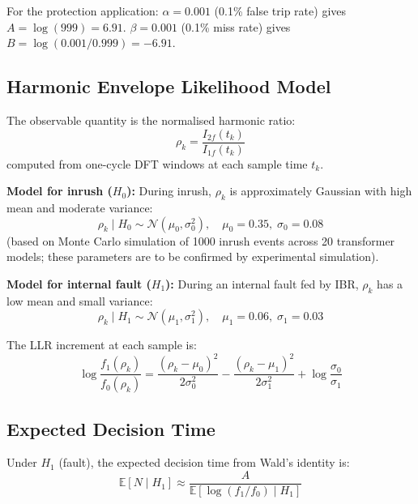 For the protection application:
$\alpha = 0.001$ (0.1\% false trip rate) gives $A = \log(999) = 6.91$.
$\beta = 0.001$ (0.1\% miss rate) gives $B = \log(0.001/0.999) = -6.91$.

\subsection{Harmonic Envelope Likelihood Model}

The observable quantity is the normalised harmonic ratio:
\begin{equation}
  \rho_k = \frac{I_{2f}(t_k)}{I_{1f}(t_k)}
  \label{eq:ch6_rho}
\end{equation}
computed from one-cycle DFT windows at each sample time $t_k$.

\textbf{Model for inrush ($H_0$):} During inrush, $\rho_k$ is approximately
Gaussian with high mean and moderate variance:
\begin{equation}
  \rho_k \mid H_0 \sim \mathcal{N}(\mu_0, \sigma_0^2), \quad
  \mu_0 = 0.35, \;\sigma_0 = 0.08
  \label{eq:ch6_h0_model}
\end{equation}
(based on Monte Carlo simulation of 1000 inrush events across 20 transformer
models; these parameters are to be confirmed by experimental simulation).

\textbf{Model for internal fault ($H_1$):} During an internal fault fed
by IBR, $\rho_k$ has a low mean and small variance:
\begin{equation}
  \rho_k \mid H_1 \sim \mathcal{N}(\mu_1, \sigma_1^2), \quad
  \mu_1 = 0.06, \;\sigma_1 = 0.03
  \label{eq:ch6_h1_model}
\end{equation}

The LLR increment at each sample is:
\begin{equation}
  \log\frac{f_1(\rho_k)}{f_0(\rho_k)} =
    \frac{(\rho_k - \mu_0)^2}{2\sigma_0^2}
    - \frac{(\rho_k - \mu_1)^2}{2\sigma_1^2}
    + \log\frac{\sigma_0}{\sigma_1}
  \label{eq:ch6_llr_increment}
\end{equation}

\subsection{Expected Decision Time}

Under $H_1$ (fault), the expected decision time from Wald's identity is:
\begin{equation}
  \mathbb{E}[N \mid H_1] \approx \frac{A}{\mathbb{E}[\log(f_1/f_0) \mid H_1]}
  \label{eq:ch6_wald_time}
\end{equation}

